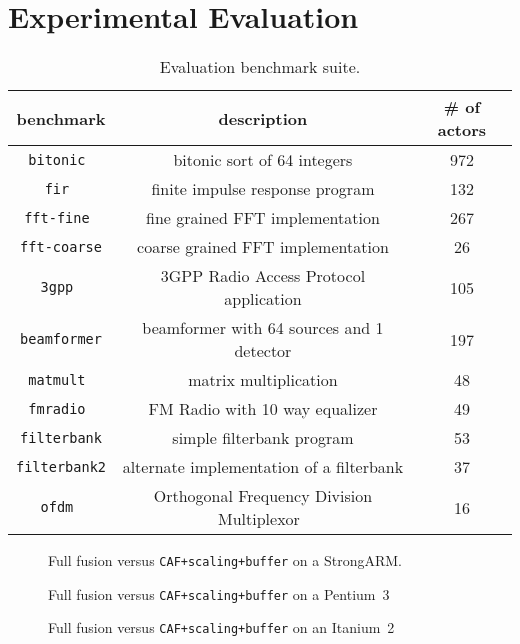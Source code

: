 \section{Experimental Evaluation}
\label{sec:evaluation}

\begin{table}[t]
\center
\label{tab:benchmarks}
\vspace{-12pt}
{\tiny
\begin{tabular}{|c|c|c|} \hline
{\bf benchmark}&{\bf description}&{\bf \# of actors}\\ \hline \hline
\texttt{bitonic	} &bitonic sort of 64 integers	&	972 \\ \hline
\texttt{fir	      } &finite impulse response program	&	132 \\ \hline
\texttt{fft-fine	} &fine grained FFT implementation	&	267 \\ \hline
\texttt{fft-coarse} &coarse grained FFT implementation	&	26 \\ \hline
\texttt{3gpp	} &3GPP Radio Access Protocol application	&	105 \\ \hline
\texttt{beamformer} &beamformer with 64 sources and 1 detector& 197 \\ \hline
\texttt{matmult	} &matrix multiplication	&	48 \\ \hline
\texttt{fmradio	} &FM Radio with 10 way equalizer	&	49 \\ \hline
\texttt{filterbank} &simple filterbank program	&	53 \\ \hline
\texttt{filterbank2}&alternate implementation of a filterbank &	37 \\ \hline
\texttt{ofdm	 }& Orthogonal Frequency Division Multiplexor~\cite{spectrumware}	&	16 \\ \hline
\end{tabular}
}
\vspace{-12pt}
\caption{Evaluation benchmark suite.}
\end{table}

\begin{figure}
\begin{minipage}{3.35in}
\caption{Full fusion versus \texttt{CAF+scaling+buffer} on a StrongARM.\protect\label{fig:arm-perf}}

\caption{Full fusion versus \texttt{CAF+scaling+buffer} on a Pentium~3\protect\label{fig:p3-perf}}

\caption{Full fusion versus \texttt{CAF+scaling+buffer} on an Itanium~2\protect\label{fig:i2-perf}}
\end{minipage}
\end{figure}

